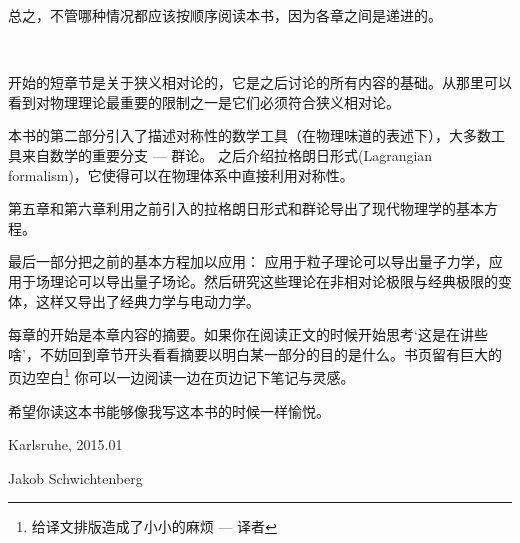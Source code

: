 总之，不管哪种情况都应该按顺序阅读本书，因为各章之间是递进的。

\ 

开始的短章节是关于狭义相对论的，它是之后讨论的所有内容的基础。从那里可以看到对物理理论最重要的限制之一是它们必须符合狭义相对论。 

本书的第二部分引入了描述对称性的数学工具（在物理味道的表述下），大多数工具来自数学的重要分支 --- 群论。 之后介绍拉格朗日形式(Lagrangian formalism)，它使得可以在物理体系中直接利用对称性。 

第五章和第六章利用之前引入的拉格朗日形式和群论导出了现代物理学的基本方程。

最后一部分把之前的基本方程加以应用： %
应用于粒子理论可以导出量子力学，应用于场理论可以导出量子场论。然后研究这些理论在非相对论极限与经典极限的变体，这样又导出了经典力学与电动力学。

每章的开始是本章内容的摘要。如果你在阅读正文的时候开始思考`这是在讲些啥'，不妨回到章节开头看看摘要以明白某一部分的目的是什么。书页留有巨大的页边空白\footnote{给译文排版造成了小小的麻烦 --- 译者}
你可以一边阅读一边在页边记下笔记与灵感。

希望你读这本书能够像我写这本书的时候一样愉悦。

\begin{flushright}
Karlsruhe, 2015.01

Jakob Schwichtenberg
\end{flushright}
